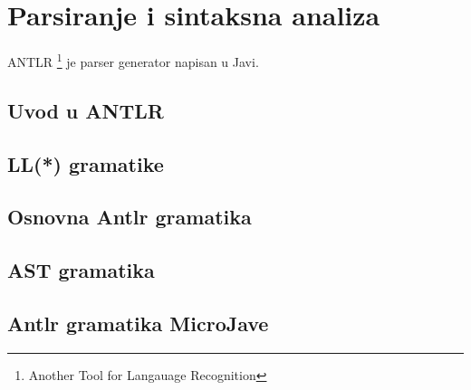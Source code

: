 \chapter{Parsiranje i sintaksna analiza}



ANTLR \footnote{Another Tool for Langauage Recognition} je parser generator napisan u Javi. 

\section{Uvod u ANTLR}

\section{LL(*) gramatike}


\section{Osnovna Antlr gramatika}

\section{AST gramatika}

\section{Antlr gramatika MicroJave}
